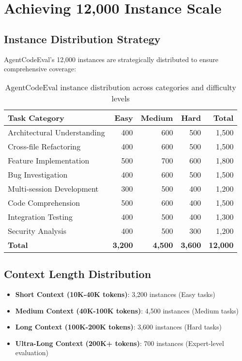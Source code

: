 \documentclass{article}
\begin{document}
\section{Achieving 12,000 Instance Scale}

\subsection{Instance Distribution Strategy}
AgentCodeEval's 12,000 instances are strategically distributed to ensure comprehensive coverage:

\begin{table}[h]
\centering
\begin{tabular}{@{}lrrrr@{}}
\toprule
Task Category & Easy & Medium & Hard & Total \\
\midrule
Architectural Understanding & 400 & 600 & 500 & 1,500 \\
Cross-file Refactoring & 400 & 600 & 500 & 1,500 \\
Feature Implementation & 500 & 700 & 600 & 1,800 \\
Bug Investigation & 400 & 600 & 500 & 1,500 \\
Multi-session Development & 300 & 500 & 400 & 1,200 \\
Code Comprehension & 500 & 600 & 400 & 1,500 \\
Integration Testing & 400 & 500 & 400 & 1,300 \\
Security Analysis & 400 & 500 & 300 & 1,200 \\
\midrule
\textbf{Total} & \textbf{3,200} & \textbf{4,500} & \textbf{3,600} & \textbf{12,000} \\
\bottomrule
\end{tabular}
\caption{AgentCodeEval instance distribution across categories and difficulty levels}
\end{table}

\subsection{Context Length Distribution}
\begin{itemize}
    \item \textbf{Short Context (10K-40K tokens)}: 3,200 instances (Easy tasks)
    \item \textbf{Medium Context (40K-100K tokens)}: 4,500 instances (Medium tasks)
    \item \textbf{Long Context (100K-200K tokens)}: 3,600 instances (Hard tasks)
    \item \textbf{Ultra-Long Context (200K+ tokens)}: 700 instances (Expert-level evaluation)
\end{itemize}
\end{document}
